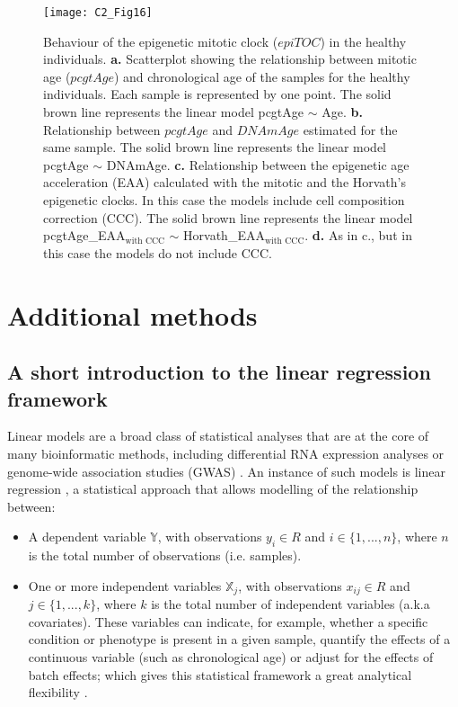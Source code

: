 \begin{figure}[htbp!] 
	\centering
	\texttt{[image: C2\_Fig16]}
	\vspace*{2mm}    
	\caption[Behaviour of the epigenetic mitotic clock ($epiTOC$) in the healthy individuals]{Behaviour of the epigenetic mitotic clock ($epiTOC$) in the healthy individuals. \textbf{a.} Scatterplot showing the relationship between mitotic age ($pcgtAge$) \cite{Yang2016} and chronological age of the samples for the healthy individuals. Each sample is represented by one point. The solid brown line represents the linear model pcgtAge $\sim$ Age. \textbf{b.} Relationship between $pcgtAge$ and $DNAmAge$ estimated for the same sample. The solid brown line represents the linear model pcgtAge $\sim$ DNAmAge. \textbf{c.} Relationship between the epigenetic age acceleration (EAA) calculated with the mitotic and the Horvath's epigenetic clocks. In this case the models include cell composition correction (CCC). The solid brown line represents the linear model pcgtAge\_EAA$_{\text{with CCC}}$ $\sim$ Horvath\_EAA$_{\text{with CCC}}$. \textbf{d.} As in c., but in this case the models do not include CCC.}
	\label{fig:c2_fig16}
\end{figure}


\section{Additional methods} \label{s:2.4}

\subsection*{A short introduction to the linear regression framework}

Linear models are a broad class of statistical analyses that are at the core of many bioinformatic methods, including differential RNA expression analyses \cite{Ritchie2015} or genome-wide association studies (GWAS) \cite{Visscher2017}. An instance of such models is linear regression \cite{Eaton2007}, a statistical approach that allows modelling of the relationship between:

\begin{itemize}
	
	\item A dependent variable $\mathbb Y$, with observations $y_i \in R$ and $i \in \{1, ..., n\}$, where $n$ is the total number of observations (i.e. samples). 
	
	\item One or more independent variables $\mathbb X_j$, with observations $x_{ij} \in R$ and $j \in \{1, ..., k\}$, where $k$ is the total number of independent variables (a.k.a covariates). These variables can indicate, for example, whether a specific condition or phenotype is present in a given sample, quantify the effects of a continuous variable (such as chronological age) or adjust for the effects of batch effects; which gives this statistical framework a great analytical flexibility \cite{Ritchie2015}.
	
\end{itemize}

